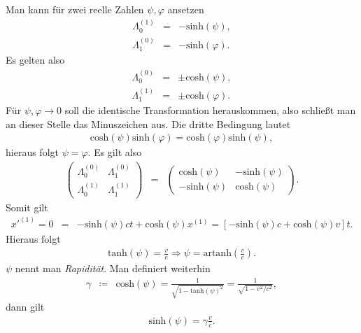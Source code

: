 \documentclass{book}
\renewcommand{\sinh}{\text{sinh}}
\renewcommand{\cosh}{\text{cosh}}
\renewcommand{\tanh}{\text{tanh}}
\begin{document}
%
Man kann für zwei reelle Zahlen $\psi, \varphi$ ansetzen
%
\begin{eqnarray}
\Lambda_0^{\left(1\right)} & = & -\sinh\left(\psi\right),\\
\Lambda_1^{(0)} & = & -\sinh\left(\varphi\right).
\end{eqnarray}
%
Es gelten also
%
\begin{eqnarray}
\Lambda_0^{(0)} & = & \pm\cosh\left(\psi\right),\\
\Lambda_1^{\left(1\right)} & = & \pm\cosh\left(\varphi\right).
\end{eqnarray}
%
Für $\psi, \varphi\to0$ soll die identische Transformation herauskommen, also schließt man an dieser Stelle das Minuszeichen aus. Die dritte Bedingung lautet
%
\begin{eqnarray}
\cosh\left(\psi\right)\sinh\left(\varphi\right) = \cosh\left(\varphi\right)\sinh\left(\psi\right), 
\end{eqnarray}
%
hieraus folgt $\psi = \varphi$. Es gilt also
%
\begin{eqnarray}
\left(\begin{array}{cc}
\Lambda_0^{(0)}&\Lambda_1^{(0)}\\
\Lambda_0^{\left(1\right)}&\Lambda_1^{\left(1\right)}
\end{array}\right) & = & \left(\begin{array}{cc}
\cosh\left(\psi\right)& -\sinh\left(\psi\right)\\
- \sinh\left(\psi\right)&\cosh\left(\psi\right)
\end{array}\right).
\end{eqnarray}
%
Somit gilt
%
\begin{eqnarray}
x'^{\left(1\right)} = 0 & = & -\sinh\left(\psi\right)ct + \cosh\left(\psi\right)x^{\left(1\right)} = \left[-\sinh\left(\psi\right)c + \cosh\left(\psi\right)v\right]t.
\end{eqnarray}
%
Hieraus folgt
%
\begin{eqnarray}
\tanh\left(\psi\right) = \frac{v}{c}\Rightarrow\psi = \text{artanh}\left(\frac{v}{c}\right).
\end{eqnarray}
%
$\psi$ nennt man \textit{Rapidität}. Man definiert weiterhin
%
\begin{eqnarray}
\gamma& \coloneqq&\cosh\left(\psi\right) = \frac{1}{\sqrt{1 - \tanh\left(\psi\right)^2}} = \frac{1}{\sqrt{1 - v^2/c^2}}, 
\end{eqnarray}
%
dann gilt
%
\begin{eqnarray}
\sinh\left(\psi\right) = \gamma\frac{v}{c}.
\end{eqnarray}
\end{document}
